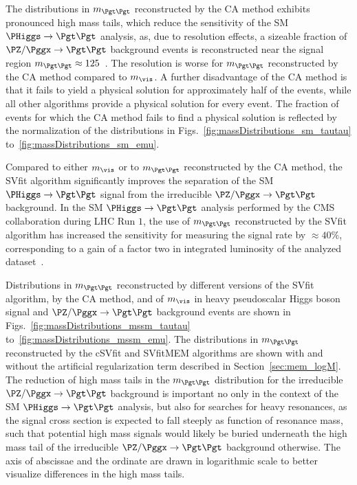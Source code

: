 The distributions in $m_{\Pgt\Pgt}$ reconstructed by the CA method
exhibits pronounced high mass tails, which reduce the sensitivity of the SM $\PHiggs \to \Pgt\Pgt$ analysis,
as, due to resolution effects, a sizeable fraction of $\PZ/\Pggx \to \Pgt\Pgt$ background events
is reconstructed near the signal region $m_{\Pgt\Pgt} \approx 125$~\GeV.
The resolution is worse for $m_{\Pgt\Pgt}$ reconstructed by the CA method compared to $m_{\vis}$.
A further disadvantage of the CA method is that it fails to yield a physical solution for approximately half of the events,
while all other algorithms provide a physical solution for every event.
The fraction of events for which the CA method fails to find a physical solution is reflected by the normalization of the distributions
in Figs.~\ref{fig:massDistributions_sm_tautau} to~\ref{fig:massDistributions_sm_emu}.

Compared to either $m_{\vis}$ or to $m_{\Pgt\Pgt}$ reconstructed by the CA method,
the SVfit algorithm significantly improves the separation of the SM $\PHiggs \to \Pgt\Pgt$ signal
from the irreducible $\PZ/\Pggx \to \Pgt\Pgt$ background.
In the SM $\PHiggs \to \Pgt\Pgt$ analysis performed by the CMS collaboration during LHC Run $1$,
the use of $m_{\Pgt\Pgt}$ reconstructed by the SVfit algorithm
has increased the sensitivity for measuring the signal rate by $\approx 40\%$,
corresponding to a gain of a factor two in integrated luminosity of the analyzed dataset~\cite{HIG-13-004}.

Distributions in $m_{\Pgt\Pgt}$ reconstructed by different versions of
the SVfit algorithm, by the CA method, and of $m_{\vis}$ in heavy
pseudoscalar Higgs boson signal and $\PZ/\Pggx \to \Pgt\Pgt$
background events are shown in
Figs.~\ref{fig:massDistributions_mssm_tautau}
to~\ref{fig:massDistributions_mssm_emu}.
The distributions in $m_{\Pgt\Pgt}$ reconstructed by the cSVfit and
SVfitMEM algorithms are shown with and without the artificial regularization
term described in Section~\ref{sec:mem_logM}. 
The reduction of high mass tails in the $m_{\Pgt\Pgt}$ distribution
for the irreducible $\PZ/\Pggx \to \Pgt\Pgt$
background is important no only in the context of the SM $\PHiggs \to
\Pgt\Pgt$ analysis, but also for searches for heavy resonances, as the signal cross section is expected to fall steeply as function of resonance mass,
such that potential high mass signals would likely be buried underneath the high mass tail of the irreducible $\PZ/\Pggx \to \Pgt\Pgt$ background otherwise.
The axis of abscissae and the ordinate are drawn in logarithmic scale to better visualize differences in the high mass tails.

